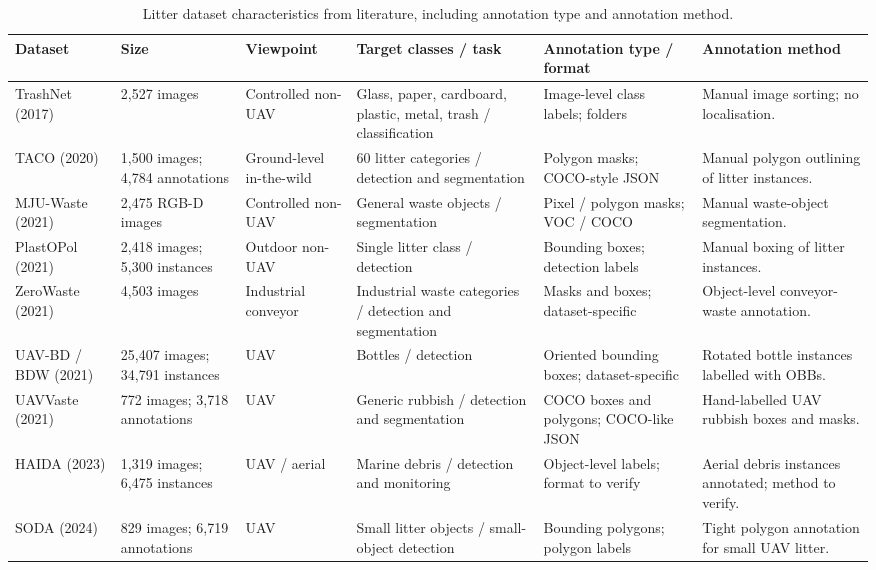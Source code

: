 \begin{table}[H]
\centering
\scriptsize
\begin{tabularx}{\textwidth}{p{}p{}p{}Xp{}p{}}
\toprule
\textbf{Dataset} & \textbf{Size} & \textbf{Viewpoint} & \textbf{Target classes / task} & \textbf{Annotation type / format} & \textbf{Annotation method} \\
\midrule
TrashNet (2017) & 2,527 images & Controlled non-UAV & Glass, paper, cardboard, plastic, metal, trash / classification & Image-level class labels; folders & Manual image sorting; no localisation. \\
\addlinespace
TACO (2020) & 1,500 images; 4,784 annotations & Ground-level in-the-wild & 60 litter categories / detection and segmentation & Polygon masks; COCO-style JSON & Manual polygon outlining of litter instances. \\
\addlinespace
MJU-Waste (2021) & 2,475 RGB-D images & Controlled non-UAV & General waste objects / segmentation & Pixel / polygon masks; VOC / COCO & Manual waste-object segmentation. \\
\addlinespace
PlastOPol (2021) & 2,418 images; 5,300 instances & Outdoor non-UAV & Single litter class / detection & Bounding boxes; detection labels & Manual boxing of litter instances. \\
\addlinespace
ZeroWaste (2021) & 4,503 images & Industrial conveyor & Industrial waste categories / detection and segmentation & Masks and boxes; dataset-specific & Object-level conveyor-waste annotation. \\
\addlinespace
UAV-BD / BDW (2021) & 25,407 images; 34,791 instances & UAV & Bottles / detection & Oriented bounding boxes; dataset-specific & Rotated bottle instances labelled with OBBs. \\
\addlinespace
UAVVaste (2021) & 772 images; 3,718 annotations & UAV & Generic rubbish / detection and segmentation & COCO boxes and polygons; COCO-like JSON & Hand-labelled UAV rubbish boxes and masks. \\
\addlinespace
HAIDA (2023) & 1,319 images; 6,475 instances & UAV / aerial & Marine debris / detection and monitoring & Object-level labels; format to verify & Aerial debris instances annotated; method to verify. \\
\addlinespace
SODA (2024) & 829 images; 6,719 annotations & UAV & Small litter objects / small-object detection & Bounding polygons; polygon labels & Tight polygon annotation for small UAV litter. \\
\bottomrule
\end{tabularx}
\caption{Litter dataset characteristics from literature, including annotation type and annotation method.}
\label{tab:datasets}
\end{table}

